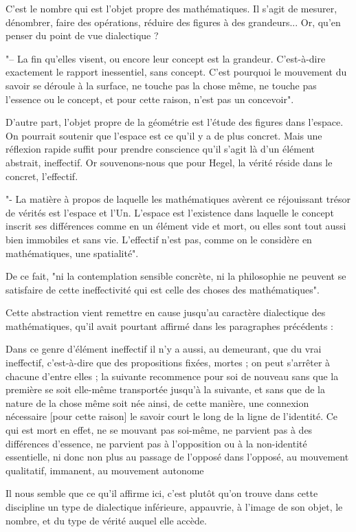 C’est le nombre qui est l’objet propre des mathématiques. Il s’agit de mesurer, dénombrer, faire des opérations, réduire des figures à des grandeurs... Or, qu’en penser du point de vue dialectique ?

"– La fin qu’elles visent, ou encore leur concept est la grandeur. C’est-à-dire exactement le rapport inessentiel, sans concept. C’est pourquoi le mouvement du savoir se déroule à la surface, ne touche pas la chose même, ne touche pas l’essence ou le concept, et pour cette raison, n’est pas un concevoir".

D’autre part, l’objet propre de la géométrie est l’étude des figures dans l’espace. On pourrait soutenir que l’espace est ce qu’il y a de plus concret. Mais une réflexion rapide suffit pour prendre conscience qu’il s’agit là d’un élément abstrait, ineffectif. Or souvenons-nous que pour Hegel, la vérité réside dans le concret, l’effectif.

"- La matière à propos de laquelle les mathématiques avèrent ce réjouissant trésor de vérités est l’espace et l’Un. L’espace est l’existence dans laquelle le concept inscrit ses différences comme en un élément vide et mort, ou elles sont tout aussi bien immobiles et sans vie. L’effectif n’est pas, comme on le considère en mathématiques, une spatialité".

De ce fait, "ni la contemplation sensible concrète, ni la philosophie ne peuvent se satisfaire de cette ineffectivité qui est celle des choses des mathématiques".

Cette abstraction vient remettre en cause jusqu’au caractère dialectique des mathématiques, qu'il avait pourtant affirmé dans les paragraphes précédents :

    Dans ce genre d’élément ineffectif il n’y a aussi, au demeurant, que du vrai ineffectif, c’est-à-dire que des propositions fixées, mortes ; on peut s’arrêter à chacune d’entre elles ; la suivante recommence pour soi de nouveau sans que la première se soit elle-même transportée jusqu’à la suivante, et sans que de la nature de la chose même soit née ainsi, de cette manière, une connexion nécessaire [pour cette raison] le savoir court le long de la ligne de l’identité. Ce qui est mort en effet, ne se mouvant pas soi-même, ne parvient pas à des différences d’essence, ne parvient pas à l’opposition ou à la non-identité essentielle, ni donc non plus au passage de l’opposé dans l’opposé, au mouvement qualitatif, immanent, au mouvement autonome

Il nous semble que ce qu’il affirme ici, c’est plutôt qu’on trouve dans cette discipline un type de dialectique inférieure, appauvrie, à l’image de son objet, le nombre, et du type de vérité auquel elle accède.

